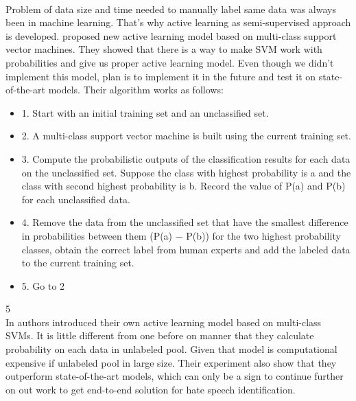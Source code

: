 \documentclass[10pt, a4paper]{article}
\begin{document}
\\Problem of data size and time needed to manually label same data was always been in machine learning. That's why active learning as semi-supervised approach is developed. \cite{LuoALPlankton} proposed new active learning model based on multi-class support vector machines. They showed that there is a way to make SVM work with probabilities and give us proper active learning model. Even though we didn't implement this model, plan is to implement it in the future and test it on state-of-the-art models. Their algorithm works as follows:
\begin{itemize}
	\item 1. Start with an initial training set and an unclassified set.
	\item 2. A multi-class support vector machine is built using the current training set.
	\item 3. Compute the probabilistic outputs of the classification results for each data on the unclassified set. Suppose the class with highest probability is a and the class with second highest probability is b. Record the value of P(a) and P(b) for each unclassified data.
	\item 4. Remove the data from the unclassified set that have the smallest difference in probabilities between them (P(a) − P(b)) for the two highest probability classes, obtain the correct label from human experts and add the labeled data to the current training set.
	\item 5. Go to 2
\end{itemize}
5\\In \cite{YangMultiClassAL} authors introduced their own active learning model based on multi-class SVMs. It is little different from one before on manner that they calculate probability on each data in unlabeled pool. Given that model is computational expensive if unlabeled pool in large size. Their experiment also show that they outperform state-of-the-art models, which can only be a sign to continue further on out work to get end-to-end solution for hate speech identification.
\end{document}
